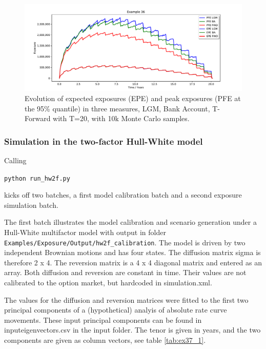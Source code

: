 \begin{figure}[h!]
\begin{center}
\includegraphics[scale=0.45]{examples/mpl_exposures_measures.pdf}
\end{center}
\caption{Evolution of expected exposures (EPE) and peak exposures (PFE at the 95\% quantile) in three measures, LGM,
  Bank Account, T-Forward with T=20, with 10k Monte Carlo samples.}
\label{fig:36}
\end{figure}

\subsubsection{Simulation in the two-factor Hull-White model}\label{example:exposure_hw2f}

Calling

\medskip
\centerline{\tt python run\_hw2f.py } 
\medskip

kicks off two batches, a first model calibration batch and a second exposure simulation batch.

The first batch illustrates the model calibration and scenario generation under a Hull-White multifactor
model with output in folder {\tt Examples/Exposure/Output/hw2f\_calibration}.
The model is driven by two independent Brownian motions and has four states. The diffusion matrix sigma is
therefore 2 x 4. The reversion matrix is a 4 x 4 diagonal matrix and entered as an array. Both diffusion and reversion
are constant in time. Their values are not calibrated to the option market, but hardcoded in simulation.xml.

The values for the diffusion and reversion matrices were fitted to the first two principal components of a
(hypothetical) analyis of absolute rate curve movements. These input principal components can be found in
inputeigenvectors.csv in the input folder. The tenor is given in years, and the two components are given as column
vectors, see table \ref{tab:ex37_1}.

